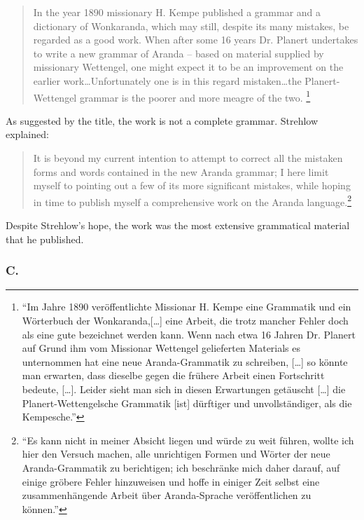\begin{quote}
In the year 1890 missionary H. Kempe published a grammar and a dictionary of Wonkaranda, which may still, despite its many mistakes, be regarded as a good work. When after some 16 years Dr. Planert undertakes to write a new grammar of Aranda – based on material supplied by missionary Wettengel, one might expect it to be an improvement on the earlier work…Unfortunately one is in this regard mistaken…the Planert-Wettengel grammar is the poorer and more meagre of the two. \citep[698]{strehlow_einige_1908}\footnote{“Im Jahre 1890 veröffentlichte Missionar H. Kempe eine Grammatik und ein Wörterbuch der Wonkaranda,[…] eine Arbeit, die trotz mancher Fehler doch als eine gute bezeichnet werden kann. Wenn nach etwa 16 Jahren Dr. Planert auf Grund ihm vom Missionar Wettengel gelieferten Materials es unternommen hat eine neue Aranda-Grammatik zu schreiben, […] so könnte man erwarten, dass dieselbe gegen die frühere Arbeit einen Fortschritt bedeute, […]. Leider sieht man sich in diesen Erwartungen getäuscht  […]  die Planert-Wettengelsche Grammatik [ist] dürftiger und unvollständiger, als die Kempesche.”}
\end{quote}

As suggested by the title, the work is not a complete grammar. Strehlow explained:

\begin{quote}
It is beyond my current intention to attempt to correct all the mistaken forms and words contained in the new Aranda grammar; I here limit myself to pointing out a few of its more significant mistakes, while hoping in time to publish myself a comprehensive work on the Aranda language.\citep[698]{strehlow_einige_1908}\footnote{“Es kann nicht in meiner Absicht liegen und würde zu weit führen, wollte ich hier den Versuch machen, alle unrichtigen Formen und Wörter der neue Aranda-Grammatik zu berichtigen; ich beschränke mich daher darauf, auf einige gröbere Fehler hinzuweisen und hoffe in einiger Zeit selbst eine zusammenhängende Arbeit über Aranda-Sprache veröffentlichen zu können.”}
\end{quote}

Despite Strehlow’s hope, the work was the most extensive grammatical material that he published.

\subsubsection{C. \citet{strehlow_notitle_1910}}
\label{sec:key:9.2.3.3}\label{bkm:Ref335827573}

